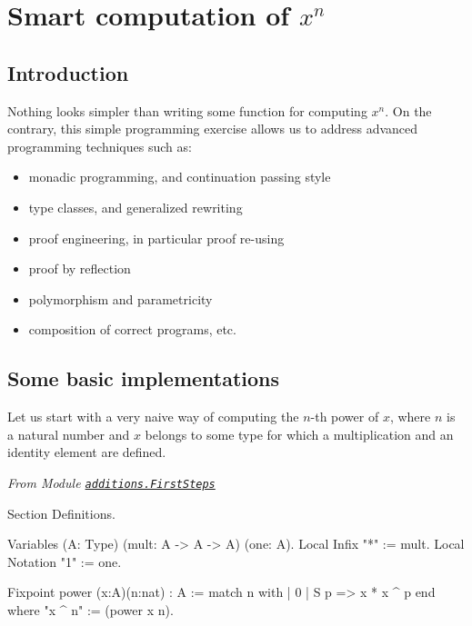 \chapter{Smart computation of \texorpdfstring{$x^n$}{Powers}}
\label{chapter-powers}
\section{Introduction}

Nothing looks simpler than writing some function for computing $x^n$.
On the contrary, this simple programming exercise allows us to address
advanced programming techniques such as:
\begin{itemize}
\item monadic programming, and continuation passing style
\item type classes, and generalized rewriting
\item proof engineering, in particular proof re-using
\item proof by reflection
\item polymorphism and parametricity
\item composition of correct programs, etc.
\end{itemize}



\section{Some basic implementations}
\label{sect:linear-naive}
Let us start with a very naive way of computing the $n$-th power of $x$, where
$n$ is a natural number and $x$ belongs to some type for which a multiplication and an identity element are defined.


\emph{From Module 
\href{../theories/html/additions.FirstSteps.html}{\texttt{additions.FirstSteps}}}
\label{sect: power-definitions}

\begin{Coqsrc}
Section Definitions.

Variables (A: Type)
           (mult: A -> A -> A)
           (one: A).
Local Infix "*" := mult.
Local Notation "1" := one.
\end{Coqsrc}

\begin{Coqsrc}
Fixpoint power (x:A)(n:nat) : A :=
  match n with 
   | 0%
   | S p =>   x * x ^ p
  end
where "x ^ n" := (power x n).

\end{Coqsrc}

